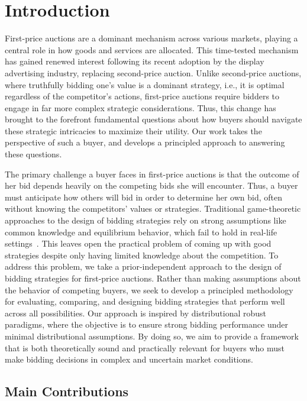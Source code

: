 \section{Introduction}\label{sec:intro}
First-price auctions are a dominant mechanism across various markets, playing a central role in how goods and services are allocated. This time-tested mechanism has gained renewed interest following its recent adoption by the display advertising industry, replacing second-price auction. Unlike second-price auctions, where truthfully bidding one's value is a dominant strategy, i.e., it is optimal regardless of the competitor’s actions, first-price auctions require bidders to engage in far more complex strategic considerations. Thus, this change has brought to the forefront fundamental questions about how buyers should navigate these strategic intricacies to maximize their utility. Our work takes the perspective of such a buyer, and develops a principled approach to answering these questions.


The primary challenge a buyer faces in first-price auctions is that the outcome of her bid depends heavily on the competing bids she will encounter. Thus, a buyer must anticipate how others will bid in order to determine her own bid, often without knowing the competitors' values or strategies. Traditional game-theoretic approaches to the design of bidding strategies rely on strong assumptions like common knowledge and equilibrium behavior, which fail to hold in real-life settings~\citep{kasberger2023robust}. This leaves open the practical problem of coming up with good strategies despite only having limited knowledge about the competition. To address this problem, we take a prior-independent approach to the design of bidding strategies for first-price auctions. Rather than making assumptions about the behavior of competing buyers, we seek to develop a principled methodology for evaluating, comparing, and designing bidding strategies that perform well across all possibilities. Our approach is inspired by distributional robust paradigms, where the objective is to ensure strong bidding performance under minimal distributional assumptions. By doing so, we aim to provide a framework that is both theoretically sound and practically relevant for buyers who must make bidding decisions in complex and uncertain market conditions.


\subsection{Main Contributions}

